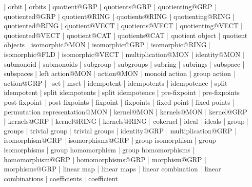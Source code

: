     |   orbit
    |   orbits
    |   quotient@GRP
    |   quotients@GRP
    |   quotienting@GRP
    |   quotiented@GRP
    |   quotient@RING
    |   quotients@RING
    |   quotienting@RING
    |   quotiented@RING
    |   quotient@VECT
    |   quotients@VECT
    |   quotienting@VECT
    |   quotiented@VECT
    |   quotient@CAT
    |   quotients@CAT
    |   quotient object
    |   quotient objects
    |   isomorphic@MON
    |   isomorphic@GRP
    |   isomorphic@RING
    |   isomorphic@FLD
    |   isomorphic@VECT
    |   multiplication@MON
    |   identity@MON
    |   submonoid
    |   submonoids
    |   subgroup
    |   subgroups
    |   subring
    |   subrings
    |   subspace
    |   subspaces
    |   left action@MON
    |   action@MON
    |   monoid action
    |   group action
    |   action@GRP
    |   --set
    |   mset
    |   idempotent
    |   idempotents
    |   idempotence 
    |   split idempotent
    |   split idempotents
    |   split idempotence 
    |   pre-fixpoint
    |   pre-fixpoints
    |   post-fixpoint
    |   post-fixpoints
    |   fixpoint
    |   fixpoints
    |   fixed point
    |   fixed points
    |   permutation representation@MON
    |   kernel@MON
    |   kernels@MON
    |   kernel@GRP
    |   kernels@GRP
    |   kernel@RING
    |   kernels@RING
    |   cokernel
    |   ideal
    |   ideals
    |   group
    |   groups
    |   trivial group
    |   trivial groups
    |   identity@GRP
    |   multiplication@GRP
    |   isomorphism@GRP
    |   isomorphisms@GRP
    |   group isomorphism
    |   group isomorphisms
    |   group homomorphism
    |   group homomorphisms
    |   homomorphism@GRP
    |   homomorphisms@GRP
    |   morphism@GRP
    |   morphisms@GRP
    |   linear map
    |   linear maps
    |   linear combination
    |   linear combinations
    |   coefficients
    |   coefficient
